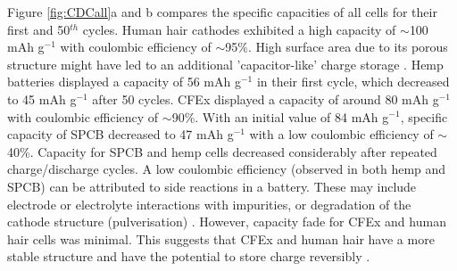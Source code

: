 \documentclass{article}
\begin{document}
Figure \ref{fig:CDCall}a and b compares the specific capacities of all cells for their first and 50$^{th}$ cycles. Human hair cathodes exhibited a high capacity of $\sim$100 mAh g$^{-1}$ with coulombic efficiency of $\sim$95$\%$. High surface area due to its porous structure might have led to an additional 'capacitor-like' charge storage \cite{frackowiak_carbon_2001}. Hemp batteries displayed a capacity of 56 mAh g$^{-1}$ in their first cycle, which decreased to 45 mAh g$^{-1}$ after 50 cycles. CFEx displayed a capacity of around 80 mAh g$^{-1}$ with coulombic efficiency of $\sim$90\%. With an initial value of 84 mAh g$^{-1}$, specific capacity of SPCB decreased to 47 mAh g$^{-1}$ with a low coulombic efficiency of $\sim$40\%. Capacity for SPCB and hemp cells decreased considerably after repeated charge/discharge cycles. A low coulombic efficiency (observed in both hemp and SPCB) can be attributed to side reactions in a battery. These may include electrode or electrolyte interactions with impurities, or degradation of the cathode structure (pulverisation) \cite{gyenes_understanding_2015-1}. However, capacity fade for CFEx and human hair cells was minimal. This suggests that CFEx and human hair have a more stable structure and have the potential to store charge reversibly \cite{pramanick_human_2016}. 
\end{document}
